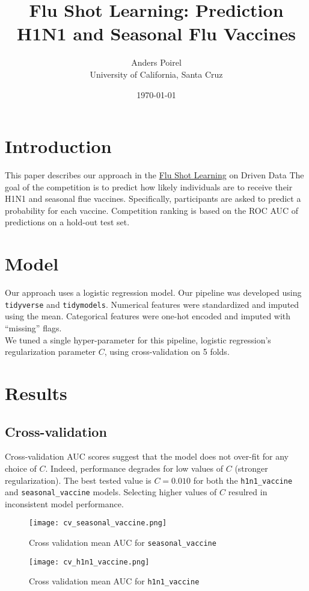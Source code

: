 \documentclass{article}[12pt]
\title{Flu Shot Learning: Prediction H1N1 and Seasonal Flu Vaccines}
\author{Anders Poirel \\ University of California, Santa Cruz}
\date{\today}
\begin{document}
    
\maketitle

\section{Introduction}

This paper describes our approach in 
the \href{https://www.drivendata.org/competitions/66/flu-shot-learning/}{Flu Shot Learning}
on Driven Data \cite{driven-data}
The goal of the competition is to predict how likely individuals are to receive their 
H1N1 and seasonal flue vaccines. Specifically, participants are asked to predict a 
probability for each vaccine. Competition ranking is based on the ROC AUC of predictions 
on a hold-out test set.

\section{Model}

Our approach uses a logistic regression model. Our pipeline was developed using
\texttt{tidyverse}\cite{tidyverse} and \texttt{tidymodels}\cite{tidymodels}. 
Numerical features were standardized and imputed using the mean. Categorical features were one-hot encoded and imputed with ``missing''
flags. \\
We tuned a single hyper-parameter for this pipeline, logistic regression's regularization
parameter $C$, using cross-validation on 5 folds. 

\section{Results}

\subsection{Cross-validation}

Cross-validation AUC scores suggest that the model does not over-fit for any choice
of $C$. Indeed, performance degrades for low values of $C$ (stronger regularization).
The best tested value is $C = 0.010$ for both the \texttt{h1n1\_vaccine} and 
\texttt{seasonal\_vaccine} models. Selecting higher values of $C$ resulred in inconsistent 
model performance. 

\begin{center}
    
\begin{figure}
\texttt{[image: cv\_seasonal\_vaccine.png]}
\caption{Cross validation mean AUC for \texttt{seasonal\_vaccine}}
\end{figure}

\begin{figure}
\texttt{[image: cv\_h1n1\_vaccine.png]}
\caption{Cross validation mean AUC for \texttt{h1n1\_vaccine}}
\end{figure}

\end{center}
\end{document}
